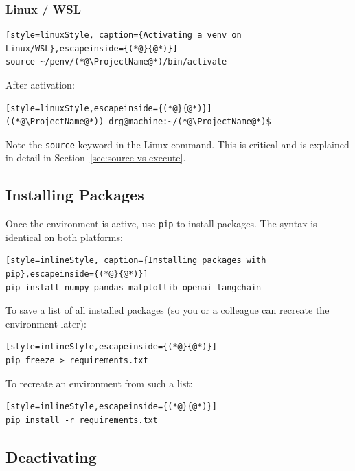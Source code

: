 \subsubsection{Linux / WSL}

\begin{lstlisting}[style=linuxStyle, caption={Activating a venv on Linux/WSL},escapeinside={(*@}{@*)}]
source ~/penv/(*@\ProjectName@*)/bin/activate
\end{lstlisting}

After activation:
\begin{lstlisting}[style=linuxStyle,escapeinside={(*@}{@*)}]
((*@\ProjectName@*)) drg@machine:~/(*@\ProjectName@*)$
\end{lstlisting}

\begin{warningbox}
Note the \texttt{source} keyword in the Linux command. This is critical and
is explained in detail in Section~\ref{sec:source-vs-execute}.
\end{warningbox}

\subsection{Installing Packages}

Once the environment is active, use \texttt{pip} to install packages.
The syntax is identical on both platforms:

\begin{lstlisting}[style=inlineStyle, caption={Installing packages with pip},escapeinside={(*@}{@*)}]
pip install numpy pandas matplotlib openai langchain
\end{lstlisting}

To save a list of all installed packages (so you or a colleague can
recreate the environment later):

\begin{lstlisting}[style=inlineStyle,escapeinside={(*@}{@*)}]
pip freeze > requirements.txt
\end{lstlisting}

To recreate an environment from such a list:

\begin{lstlisting}[style=inlineStyle,escapeinside={(*@}{@*)}]
pip install -r requirements.txt
\end{lstlisting}

\subsection{Deactivating}


